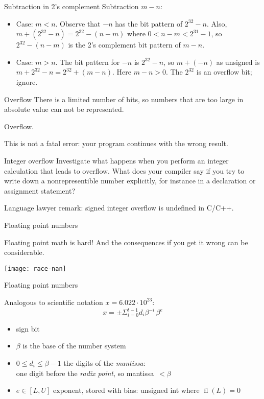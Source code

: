 \begin{numberedframe}{Subtraction in 2's complement}
Subtraction $m-n$:
\begin{itemize}
\item Case: $m<n$. Observe that $-n$ has the bit pattern of $2^{32}-n$.
  Also, $m+(2^{32}-n)=2^{32}-(n-m)$ where $0<n-m<2^{31}-1$,
  so $2^{32}-(n-m)$ is the 2's complement bit pattern of $m-n$.
\item Case: $m>n$.  The bit pattern for $-n$ is $2^{32}-n$, so
  $m+(-n)$ as unsigned is $m+2^{32}-n=2^{32}+(m-n)$. Here
  $m-n>0$. The $2^{32}$ is an overflow bit; ignore.
\end{itemize}
\end{numberedframe}

\begin{numberedframe}{Overflow}
  There is a limited number of bits, so numbers that are too large in
  absolute value can not be represented.

  Overflow.

  This is not a fatal error: your program continues with the wrong result.
\end{numberedframe}

\begin{exercise}{Integer overflow}
  Investigate what happens when you perform an integer calculation
  that leads to overflow. What
  does your compiler say if you try to write down a nonrepresentible
  number explicitly, for instance in a declaration or assignment statement?

  Language lawyer remark: signed integer overflow is undefined in C/C++.
\end{exercise}

 {Floating point numbers}

\renewcommand\repr{\mathop{\mathrm{fl}}}

\begin{numberedframe}{Floating point math is hard!}
  And the consequences if you get it wrong can be considerable.
  
  \texttt{[image: race-nan]}
\end{numberedframe}

\begin{numberedframe}{Floating point numbers}

Analogous to scientific notation $x=6.022\cdot 10^{23}$:
\[ x = \pm \Sigma_{i=0}^{t-1} d_i\beta^{-i} \, \beta^e \]
\begin{itemize}
\item sign bit
\item $\beta$ is the base of the number system
\item $0\leq d_i\leq \beta-1$ the digits of the \emph{mantissa}:\\
  one digit before the \emph{radix point}, so mantissa~$<\beta$
\item $e\in [L,U]$ exponent, stored with bias: unsigned int where
  $\repr(L)=0$
\end{itemize}
\end{numberedframe}

